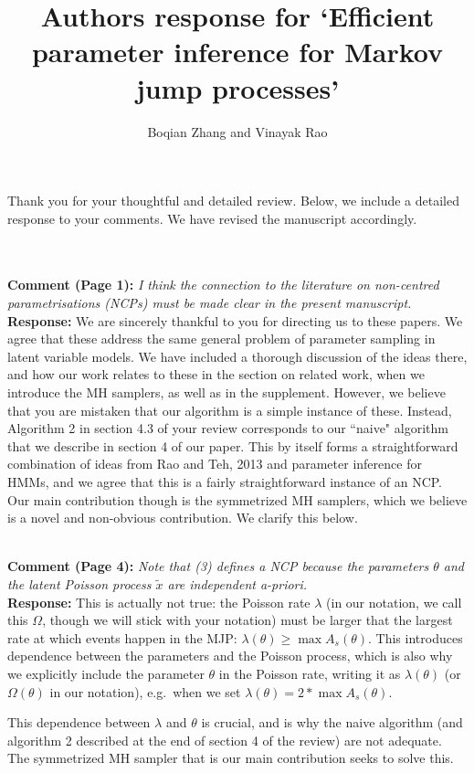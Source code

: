 \documentclass[11pt]{article}
\title{Authors response for `Efficient parameter inference for Markov jump processes'}
\author{Boqian Zhang and Vinayak Rao }
\date{}
\newcommand{\rev}[2]{\textbf{Comment #1: }\emph{#2}}
\newcommand{\resp}{\textbf{Response: }}
\begin{document}
\maketitle

Thank you for your thoughtful and detailed review. Below, we include a detailed response to your comments. We have revised the manuscript accordingly. 

~\\~\\
\rev{(Page 1)}{I think the connection to the literature on non-centred parametrisations (NCPs) must be made clear in the present manuscript.}\\ 
\resp 
We are sincerely thankful to you for directing us to these papers. We agree that these address the same general problem of parameter sampling in latent variable models. 
We have included a thorough discussion of the ideas there, and how our work relates to these in the section on related work, when we introduce the MH samplers, as well as in the supplement. 
However, we believe that you are mistaken that our algorithm is a simple instance of these. 
Instead, Algorithm 2 in section 4.3 of your review corresponds to our ``naive" algorithm that we describe in section 4 of our paper. 
This by itself forms a straightforward combination of ideas from Rao and Teh, 2013 and parameter inference for HMMs, and we agree that this is a fairly straightforward instance of an NCP. 
Our main contribution though is the symmetrized MH samplers, which we believe is a novel and non-obvious contribution. We clarify this below.

~\\
\rev{(Page 4)}{Note that (3) defines a NCP because the parameters $\theta$ and the latent Poisson process $\tilde{x}$ are independent a-priori.}\\
\resp{This is actually not true: the Poisson rate $\lambda$ (in our notation, we call this $\Omega$, though we will stick with your notation) must be larger that the largest rate at which events happen in the MJP: 
  $\lambda(\theta) \ge \max A_s(\theta)$. 
  This introduces dependence between the parameters and the Poisson process, which is also why we explicitly include the parameter $\theta$ in the Poisson rate, writing it as $\lambda(\theta)$ (or $\Omega(\theta)$ in our notation), e.g.\ when we set 
$\lambda(\theta) = 2 * \max A_s(\theta)$.}

This dependence between $\lambda$ and $\theta$ is crucial, and is why the naive algorithm (and algorithm 2 described at the end of section 4 of the review) are not adequate. 
The symmetrized MH sampler that is our main contribution seeks to solve this.
\end{document}
